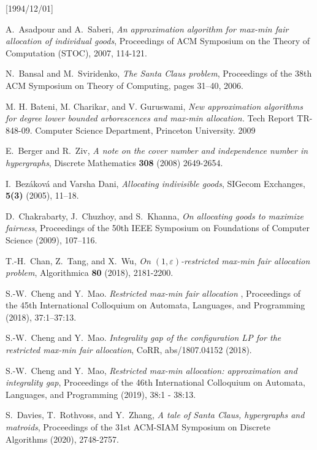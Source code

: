 \NeedsTeXFormat{LaTeX2e}[1994/12/01]\documentclass[letterpaper, 11pt]{article}
\theoremstyle{definition}
\theoremstyle{remark}
\numberwithin{equation}{section}
\begin{document}
\begin{thebibliography}{10}
A.~Asadpour and A.~Saberi, \emph{An approximation algorithm for
  max-min fair allocation of individual goods}, Proceedings of ACM
Symposium on the Theory of Computation (STOC), 2007, 114-121.

N.~Bansal and M.~Sviridenko, \emph{The Santa Claus problem}, Proceedings
of the 38th ACM Symposium on Theory of Computing, pages 31–40, 2006.

  M. H. Bateni, M. Charikar, and V. Guruswami, \emph{New approximation
    algorithms for degree lower bounded arborescences and max-min
    allocation.} Tech Report TR-848-09. Computer Science Department,
    Princeton University. 2009
  
E.~Berger and R.~Ziv, \emph{A note on the cover number and independence number in hypergraphs}, Discrete Mathematics \textbf{308} (2008) 2649-2654.

I.~Bez\'akov\'a and Varsha Dani, \emph{Allocating indivisible goods},
SIGecom Exchanges, \textbf{5(3)} (2005), 11–18.

D.~Chakrabarty, J.~Chuzhoy, and S.~Khanna, \emph{On allocating goods to
  maximize fairness},
Proceedings of the 50th IEEE Symposium on Foundations of Computer
Science (2009), 107–116.

T.-H.~Chan, Z.~Tang, and X.~Wu, \emph{On $(1,\varepsilon)$-restricted max-min fair allocation problem}, Algorithmica \textbf{80} (2018), 2181-2200. 

S.-W.~Cheng and Y.~Mao. \emph{Restricted max-min fair allocation} , Proceedings of the 45th
International Colloquium on Automata, Languages, and Programming (2018), 37:1–37:13.

S.-W.~Cheng and Y.~Mao. \emph{Integrality gap of the configuration LP for the restricted max-min
  fair allocation}, CoRR, abs/1807.04152 (2018).

S.-W.~Cheng and Y.~Mao, \emph{Restricted max-min allocation:
  approximation and integrality gap}, Proceedings of the 46th
International Colloquium on Automata, Languages, and Programming
(2019), 38:1 - 38:13.

S.~Davies, T.~Rothvoss, and Y.~Zhang, \emph{A tale of Santa Claus,
  hypergraphs and matroids}, Proceedings of
the 31st ACM-SIAM 
Symposium on Discrete Algorithms (2020), 2748-2757.


\end{thebibliography}
\end{document}
